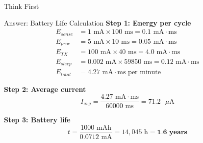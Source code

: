 \documentclass[aspectratio=169,11pt]{beamer}
\begin{document}
\begin{frame}{Think First}
    \begin{center}
    \end{center}
\end{frame}

\begin{frame}{Answer: Battery Life Calculation}
    \textbf{Step 1: Energy per cycle}
    \begin{align*}
        E_{sense} &= 1 \text{ mA} \times 100 \text{ ms} = 0.1 \text{ mA} \cdot \text{ms} \\
        E_{proc} &= 5 \text{ mA} \times 10 \text{ ms} = 0.05 \text{ mA} \cdot \text{ms} \\
        E_{TX} &= 100 \text{ mA} \times 40 \text{ ms} = 4.0 \text{ mA} \cdot \text{ms} \\
        E_{sleep} &= 0.002 \text{ mA} \times 59850 \text{ ms} = 0.12 \text{ mA} \cdot \text{ms} \\
        E_{total} &= 4.27 \text{ mA} \cdot \text{ms per minute}
    \end{align*}
    
    \textbf{Step 2: Average current}
    \[
    I_{avg} = \frac{4.27 \text{ mA} \cdot \text{ms}}{60000 \text{ ms}} = 71.2 \text{ } \mu\text{A}
    \]
    
    \textbf{Step 3: Battery life}
    \[
    t = \frac{1000 \text{ mAh}}{0.0712 \text{ mA}} = 14,045 \text{ h} = \textbf{1.6 years}
    \]
\end{frame}
\end{document}
